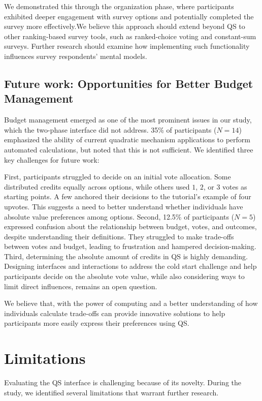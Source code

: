 We demonstrated this through the organization phase, where participants exhibited deeper engagement with survey options and potentially completed the survey more effectively.We believe this approach should extend beyond QS to other ranking-based survey tools, such as ranked-choice voting and constant-sum surveys. Further research should examine how implementing such functionality influences survey respondents' mental models.

\subsection{Future work: Opportunities for Better Budget Management}
Budget management emerged as one of the most prominent issues in our study, which the two-phase interface did not address. 35\% of participants ($N=14$) emphasized the ability of current quadratic mechanism applications to perform automated calculations, but noted that this is not sufficient.  We identified three key challenges for future work:

First, participants struggled to decide on an initial vote allocation. Some distributed credits equally across options, while others used $1$, $2$, or $3$ votes as starting points. A few anchored their decisions to the tutorial's example of four upvotes. This suggests a need to better understand whether individuals have absolute value preferences among options. Second, 12.5\% of participants ($N=5$) expressed confusion about the relationship between budget, votes, and outcomes, despite understanding their definitions. They struggled to make trade-offs between votes and budget, leading to frustration and hampered decision-making. Third, determining the absolute amount of credits in QS is highly demanding. Designing interfaces and interactions to address the cold start challenge and help participants decide on the absolute vote value, while also considering ways to limit direct influences, remains an open question.

We believe that, with the power of computing and a better understanding of how individuals calculate trade-offs can provide innovative solutions to help participants more easily express their preferences using QS.

\section{Limitations}
\label{sec:limitations}
Evaluating the QS interface is challenging because of its novelty. During the study, we identified several limitations that warrant further research.

